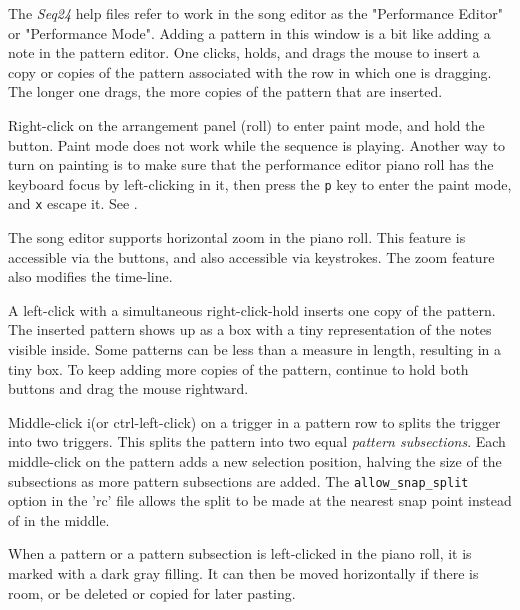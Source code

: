    The \textsl{Seq24} help files refer to work in the song editor as the
   "Performance Editor" or "Performance Mode".  Adding a pattern in this
   window is a bit like adding a note in the pattern editor.
   One clicks, holds, and drags the mouse to insert a copy or copies of the
   pattern associated with the row in which one is dragging.
   The longer one drags, the more copies of the pattern that are inserted.

	Right-click on the arrangement panel (roll) to enter
   paint mode, and hold the button.
   Paint mode does not work while the sequence is playing.
   Another way to turn on painting is to
   make sure that the performance editor piano roll has the
   keyboard focus by left-clicking in it, then press the
   \texttt{p} key to enter the paint mode, and
   \texttt{x} escape it.
   See .

   The song editor supports horizontal zoom in the piano roll.
   This feature is accessible via the buttons, and also
   accessible via keystrokes.
   The zoom feature also modifies the time-line.

   A left-click with a simultaneous right-click-hold inserts one copy of the
   pattern.  The inserted pattern shows up as a box with a tiny
   representation of the notes visible inside.  Some patterns can
   be less than a measure in length, resulting in a tiny box.
   To keep adding more copies of the pattern, continue to hold both buttons
   and drag the mouse rightward.

   Middle-click i(or ctrl-left-click) on a trigger in a pattern row
   to splits the trigger into two triggers.
   This splits the pattern into two equal \textsl{pattern subsections}.
   Each middle-click on the pattern adds a new selection position,
   halving the size of the subsections as more pattern subsections are
   added.  The \texttt{allow\_snap\_split} option in the 'rc' file
   allows the split to be made at the nearest snap point instead of in the middle.

   When a pattern or a pattern subsection is left-clicked in the piano
   roll, it is marked with a dark gray filling.
   It can then be moved horizontally if there is room, or be deleted or copied for
   later pasting.

